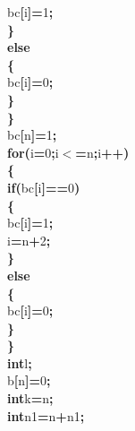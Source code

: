 \documentclass[a4paper, 11pt]{article}
\newcommand\SPC{\hspace*{0.6em}}
\newcommand\HYP{\mbox{\char 45}}
\newcommand{\CppAIdentifier}[1]{#1}
\newcommand{\CppANumber}[1]{\textcolor[rgb]{0.5,0,0.5}{#1}}
\newcommand{\CppAReservedWord}[1]{\textbf{#1}}
\newcommand{\CppASpace}[1]{\colorbox[rgb]{1,1,1}{#1}}
\newcommand{\CppASymbol}[1]{\textbf{\textcolor[rgb]{1,0,0}{#1}}}
\begin{document}
\begin{ttfamily}
\CppAIdentifier{bc}\CppASymbol{[}\CppAIdentifier{i}\CppASymbol{]}\CppASymbol{=}\CppANumber{1}\CppASymbol{;}\\
\CppASymbol{\}}\\
\CppAReservedWord{else}\\
\CppASymbol{\{}\\
\CppAIdentifier{bc}\CppASymbol{[}\CppAIdentifier{i}\CppASymbol{]}\CppASymbol{=}\CppANumber{0}\CppASymbol{;}\\
\CppASymbol{\}}\\
\CppASymbol{\}}\\
\CppAIdentifier{bc}\CppASymbol{[}\CppAIdentifier{n}\CppASymbol{]}\CppASymbol{=}\CppANumber{1}\CppASymbol{;}\\
\CppAReservedWord{for}\CppASymbol{(}\CppAIdentifier{i}\CppASymbol{=}\CppANumber{0}\CppASymbol{;}\CppAIdentifier{i}\CppASymbol{$<$=}\CppAIdentifier{n}\CppASymbol{;}\CppAIdentifier{i}\CppASymbol{++}\CppASymbol{)}\\
\CppASymbol{\{}\\
\CppAReservedWord{if}\CppASymbol{(}\CppAIdentifier{bc}\CppASymbol{[}\CppAIdentifier{i}\CppASymbol{]}\CppASymbol{==}\CppANumber{0}\CppASymbol{)}\\
\CppASymbol{\{}\\
\CppAIdentifier{bc}\CppASymbol{[}\CppAIdentifier{i}\CppASymbol{]}\CppASymbol{=}\CppANumber{1}\CppASymbol{;}\\
\CppAIdentifier{i}\CppASymbol{=}\CppAIdentifier{n}\CppASymbol{+}\CppANumber{2}\CppASymbol{;}\\
\CppASymbol{\}}\\
\CppAReservedWord{else}\\
\CppASymbol{\{}\\
\CppAIdentifier{bc}\CppASymbol{[}\CppAIdentifier{i}\CppASymbol{]}\CppASymbol{=}\CppANumber{0}\CppASymbol{;}\\
\CppASymbol{\}}\\
\CppASymbol{\}}\\
\CppAReservedWord{int}\CppASpace{\SPC }\CppAIdentifier{l}\CppASymbol{;}\\
\CppAIdentifier{b}\CppASymbol{[}\CppAIdentifier{n}\CppASymbol{]}\CppASymbol{=}\CppANumber{0}\CppASymbol{;}\\
\CppAReservedWord{int}\CppASpace{\SPC }\CppAIdentifier{k}\CppASymbol{=}\CppAIdentifier{n}\CppASymbol{;}\\
\CppAReservedWord{int}\CppASpace{\SPC }\CppAIdentifier{n1}\CppASymbol{=}\CppAIdentifier{n}\CppASymbol{+}\CppAIdentifier{n}\CppASymbol{\HYP }\CppANumber{1}\CppASymbol{;}\\

\end{ttfamily}
\end{document}
